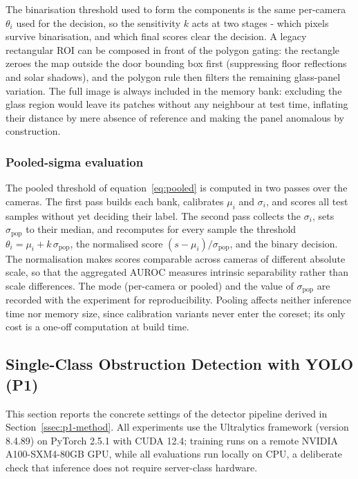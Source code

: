 The binarisation threshold used to form the components is the same per-camera
$\theta_i$ used for the decision, so the sensitivity $k$ acts at two stages -
which pixels survive binarisation, and which final scores clear the decision. A
legacy rectangular ROI can be composed in front of the polygon gating: the
rectangle zeroes the map outside the door bounding box first (suppressing floor
reflections and solar shadows), and the polygon rule then filters the remaining
glass-panel variation. The full image is always included in the memory bank:
excluding the glass region would leave its patches without any neighbour at test
time, inflating their distance by mere absence of reference and making the panel
anomalous by construction.

\subsubsection{Pooled-sigma evaluation}

The pooled threshold of equation~\eqref{eq:pooled} is computed in two passes over
the cameras. The first pass builds each bank, calibrates $\mu_i$ and $\sigma_i$,
and scores all test samples without yet deciding their label. The second pass
collects the $\sigma_i$, sets $\sigma_{\mathrm{pop}}$ to their median, and
recomputes for every sample the threshold $\theta_i = \mu_i + k\,\sigma_{\mathrm{pop}}$,
the normalised score $(s - \mu_i)/\sigma_{\mathrm{pop}}$, and the binary decision.
The normalisation makes scores comparable across cameras of different absolute
scale, so that the aggregated AUROC measures intrinsic separability rather than
scale differences. The mode (per-camera or pooled) and the value of
$\sigma_{\mathrm{pop}}$ are recorded with the experiment for reproducibility.
Pooling affects neither inference time nor memory size, since calibration
variants never enter the coreset; its only cost is a one-off computation at build
time.

\subsection{Single-Class Obstruction Detection with YOLO (P1)}
\label{ssec:p1-setup}

This section reports the concrete settings of the detector pipeline derived in
Section~\ref{ssec:p1-method}. All experiments use the Ultralytics framework
(version 8.4.89) on PyTorch 2.5.1 with CUDA 12.4; training runs on a remote
NVIDIA A100-SXM4-80GB GPU, while all evaluations run locally on CPU, a
deliberate check that inference does not require server-class hardware.

